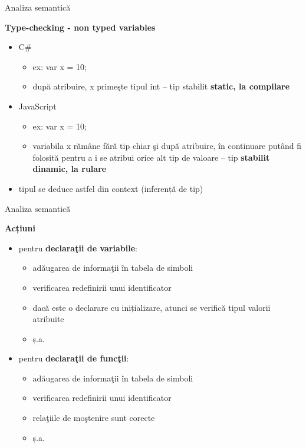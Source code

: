 \documentclass[pdf]{beamer}
\begin{document}
\begin{frame}{Analiza semantică}

\textbf{Type-checking - non typed variables}

\begin{itemize}
\item
C\#
\begin{itemize}
\item 
ex: var x = 10;
\item
după atribuire, x primeşte tipul int – tip stabilit \textbf{static, la compilare}
\end{itemize}

\item
JavaScript
\begin{itemize}
\item
ex: var x = 10;
\item
variabila x rămâne fără tip chiar şi după atribuire, în continuare putând fi folosită pentru a i se atribui orice alt tip de valoare – tip \textbf{stabilit dinamic, la rulare}
\end{itemize}

\item
tipul se deduce astfel din context (inferență de tip)

\end{itemize}
\end{frame}



\begin{frame}{Analiza semantică}

\textbf{Acțiuni}

\begin{itemize}
\item
pentru \textbf{declaraţii de variabile}:
\begin{itemize}
\item
adăugarea de informaţii în tabela de simboli
\item
verificarea redefinirii unui identificator
\item
dacă este o declarare cu inițializare, atunci se verifică tipul valorii atribuite
\item
ș.a.
\end{itemize}

\item
pentru \textbf{declaraţii de funcţii}:
\begin{itemize}
\item
adăugarea de informaţii în tabela de simboli
\item
verificarea redefinirii unui identificator
\item
relaţiile de moştenire sunt corecte
\item
ș.a.
\end{itemize}

\end{itemize}
\end{frame}
\end{document}
